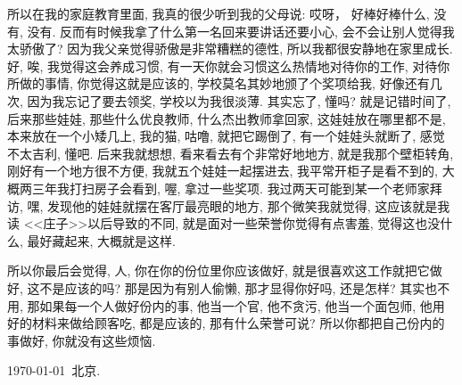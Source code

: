 \documentclass[11pt]{article}
\def\beginrefs{\begin{list}%
		{[\arabic{equation}]}{\usecounter{equation}
			\setlength{\leftmargin}{0.8truecm}\setlength{\labelsep}{0.4truecm}%
			\setlength{\labelwidth}{1.6truecm}}}
\def\endrefs{\end{list}}
\def\bibentry#1{\item[\hbox{[#1]}]}
\begin{document}
所以在我的家庭教育里面, 我真的很少听到我的父母说: 哎呀， 好棒好棒什么, 没有, 没有. 反而有时候我拿了什么第一名回来要讲话还要小心, 会不会让别人觉得我太骄傲了? 因为我父亲觉得骄傲是非常糟糕的德性, 所以我都很安静地在家里成长. 好, 唉, 我觉得这会养成习惯, 有一天你就会习惯这么热情地对待你的工作, 对待你所做的事情, 你觉得这就是应该的, 学校莫名其妙地颁了个奖项给我, 好像还有几次, 因为我忘记了要去领奖, 学校以为我很淡薄. 其实忘了, 懂吗? 就是记错时间了, 后来那些娃娃, 那些什么优良教师, 什么杰出教师拿回家, 这娃娃放在哪里都不是, 本来放在一个小矮几上, 我的猫, 咕噜, 就把它踢倒了, 有一个娃娃头就断了, 感觉不太吉利, 懂吧. 后来我就想想, 看来看去有个非常好地地方, 就是我那个壁柜转角, 刚好有一个地方很不方便, 我就五个娃娃一起摆进去, 我平常开柜子是看不到的, 大概两三年我打扫房子会看到, 喔, 拿过一些奖项. 我过两天可能到某一个老师家拜访, 嘿, 发现他的娃娃就摆在客厅最亮眼的地方, 那个微笑我就觉得, 这应该就是我读 <<庄子>>以后导致的不同, 就是面对一些荣誉你觉得有点害羞, 觉得这也没什么, 最好藏起来, 大概就是这样. 

所以你最后会觉得, 人, 你在你的份位里你应该做好, 就是很喜欢这工作就把它做好, 这不是应该的吗? 那是因为有别人偷懒, 那才显得你好吗, 还是怎样? 其实也不用, 那如果每一个人做好份内的事, 他当一个官, 他不贪污, 他当一个面包师, 他用好的材料来做给顾客吃, 都是应该的, 那有什么荣誉可说? 所以你都把自己份内的事做好, 你就没有这些烦恼.


%
\begin{flushright}
	 \tiny \kaishu \today  \  北京.
\end{flushright}
	 



\end{document}
